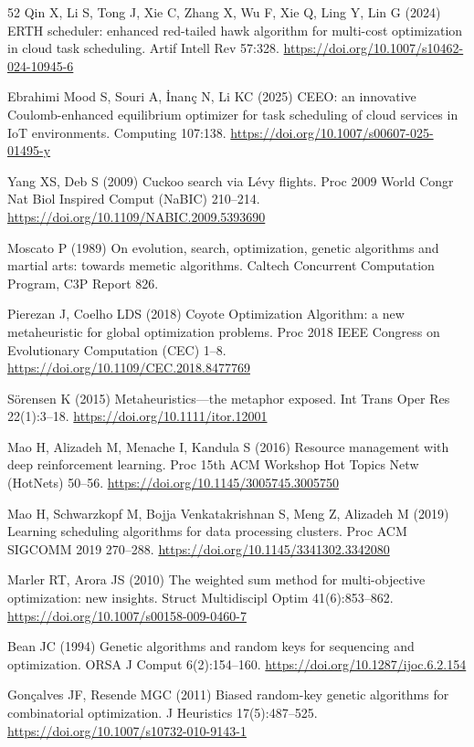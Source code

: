 \documentclass[pdflatex,onecolumn,sn-mathphys-num]{sn-jnl}
\begin{document}
\begin{thebibliography}{52}
Qin X, Li S, Tong J, Xie C, Zhang X, Wu F, Xie Q, Ling Y, Lin G (2024) ERTH scheduler: enhanced red-tailed hawk algorithm for multi-cost optimization in cloud task scheduling. Artif Intell Rev 57:328. \url{https://doi.org/10.1007/s10462-024-10945-6}

Ebrahimi Mood S, Souri A, \.{I}nan\c{c} N, Li KC (2025) CEEO: an innovative Coulomb-enhanced equilibrium optimizer for task scheduling of cloud services in IoT environments. Computing 107:138. \url{https://doi.org/10.1007/s00607-025-01495-y}

Yang XS, Deb S (2009) Cuckoo search via L\'{e}vy flights. Proc 2009 World Congr Nat Biol Inspired Comput (NaBIC) 210--214. \url{https://doi.org/10.1109/NABIC.2009.5393690}

Moscato P (1989) On evolution, search, optimization, genetic algorithms and martial arts: towards memetic algorithms. Caltech Concurrent Computation Program, C3P Report 826.

Pierezan J, Coelho LDS (2018) Coyote Optimization Algorithm: a new metaheuristic for global optimization problems. Proc 2018 IEEE Congress on Evolutionary Computation (CEC) 1--8. \url{https://doi.org/10.1109/CEC.2018.8477769}

S\"{o}rensen K (2015) Metaheuristics---the metaphor exposed. Int Trans Oper Res 22(1):3--18. \url{https://doi.org/10.1111/itor.12001}

Mao H, Alizadeh M, Menache I, Kandula S (2016) Resource management with deep reinforcement learning. Proc 15th ACM Workshop Hot Topics Netw (HotNets) 50--56. \url{https://doi.org/10.1145/3005745.3005750}

Mao H, Schwarzkopf M, Bojja Venkatakrishnan S, Meng Z, Alizadeh M (2019) Learning scheduling algorithms for data processing clusters. Proc ACM SIGCOMM 2019 270--288. \url{https://doi.org/10.1145/3341302.3342080}

Marler RT, Arora JS (2010) The weighted sum method for multi-objective optimization: new insights. Struct Multidiscipl Optim 41(6):853--862. \url{https://doi.org/10.1007/s00158-009-0460-7}

Bean JC (1994) Genetic algorithms and random keys for sequencing and optimization. ORSA J Comput 6(2):154--160. \url{https://doi.org/10.1287/ijoc.6.2.154}

Gon\c{c}alves JF, Resende MGC (2011) Biased random-key genetic algorithms for combinatorial optimization. J Heuristics 17(5):487--525. \url{https://doi.org/10.1007/s10732-010-9143-1}


\end{thebibliography}
\end{document}
